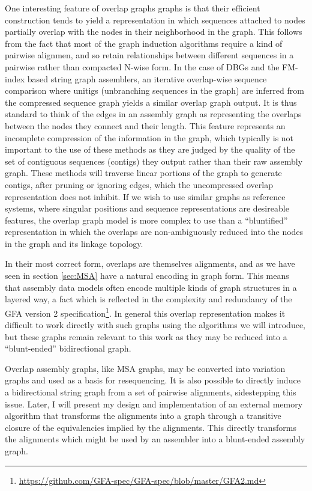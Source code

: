 One interesting feature of overlap graphs graphs is that their efficient construction tends to yield a representation in which sequences attached to nodes partially overlap with the nodes in their neighborhood in the graph.
This follows from the fact that most of the graph induction algorithms require a kind of pairwise alignmen, and so retain relationships between different sequences in a pairwise rather than compacted N-wise form.
In the case of DBGs and the FM-index based string graph assemblers, an iterative overlap-wise sequence comparison where unitigs (unbranching sequences in the graph) are inferred from the compressed sequence graph yields a similar overlap graph output.
It is thus standard to think of the edges in an assembly graph as representing the overlaps between the nodes they connect and their length.
This feature represents an incomplete compression of the information in the graph, which typically is not important to the use of these methods as they are judged by the quality of the set of contiguous sequences (contigs) they output rather than their raw assembly graph.
These methods will traverse linear portions of the graph to generate contigs, after pruning or ignoring edges, which the uncompressed overlap representation does not inhibit.
If we wish to use similar graphs as reference systems, where singular positions and sequence representations are desireable features, the overlap graph model is more complex to use than a ``bluntified'' representation in which the overlaps are non-ambiguously reduced into the nodes in the graph and its linkage topology.

In their most correct form, overlaps are themselves alignments, and as we have seen in section \ref{sec:MSA} have a natural encoding in graph form.
This means that assembly data models often encode multiple kinds of graph structures in a layered way, a fact which is reflected in the complexity and redundancy of the GFA version 2 specification\footnote{\url{https://github.com/GFA-spec/GFA-spec/blob/master/GFA2.md}}.
In general this overlap representation makes it difficult to work directly with such graphs using the algorithms we will introduce, but these graphs remain relevant to this work as they may be reduced into a ``blunt-ended'' bidirectional graph.


Overlap assembly graphs, like MSA graphs, may be converted into variation graphs and used as a basis for resequencing.
It is also possible to directly induce a bidirectional string graph from a set of pairwise alignments, sidestepping this issue.
Later, I will present my design and implementation of an external memory algorithm that transforms the alignments into a graph through a transitive closure of the equivalencies implied by the alignments.
This directly transforms the alignments which might be used by an assembler into a blunt-ended assembly graph.

